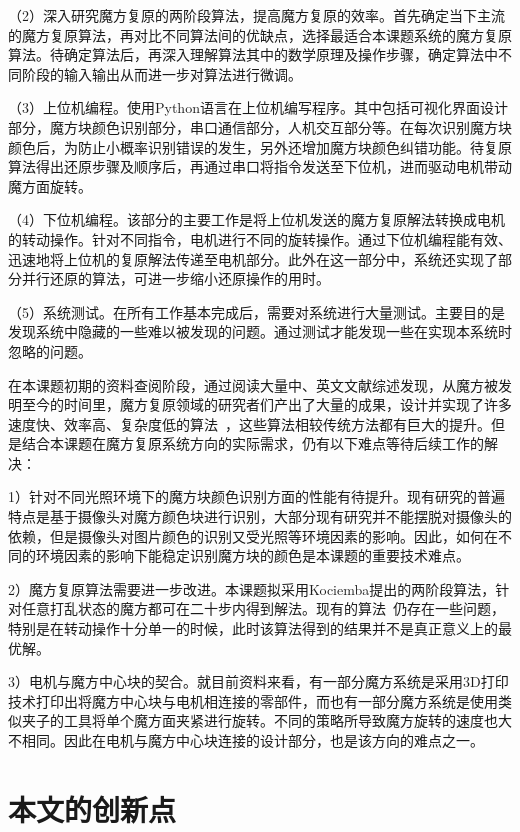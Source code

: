 （2）深入研究魔方复原的两阶段算法，提高魔方复原的效率。首先确定当下主流的魔方复原算法，再对比不同算法间的优缺点，选择最适合本课题系统的魔方复原算法。待确定算法后，再深入理解算法其中的数学原理及操作步骤，确定算法中不同阶段的输入输出从而进一步对算法进行微调。

（3）上位机编程。使用Python语言在上位机编写程序。其中包括可视化界面设计部分，魔方块颜色识别部分，串口通信部分，人机交互部分等。在每次识别魔方块颜色后，为防止小概率识别错误的发生，另外还增加魔方块颜色纠错功能。待复原算法得出还原步骤及顺序后，再通过串口将指令发送至下位机，进而驱动电机带动魔方面旋转。

（4）下位机编程。该部分的主要工作是将上位机发送的魔方复原解法转换成电机的转动操作。针对不同指令，电机进行不同的旋转操作。通过下位机编程能有效、迅速地将上位机的复原解法传递至电机部分。此外在这一部分中，系统还实现了部分并行还原的算法，可进一步缩小还原操作的用时。

（5）系统测试。在所有工作基本完成后，需要对系统进行大量测试。主要目的是发现系统中隐藏的一些难以被发现的问题。通过测试才能发现一些在实现本系统时忽略的问题。

在本课题初期的资料查阅阶段，通过阅读大量中、英文文献综述发现，从魔方被发明至今的时间里，魔方复原领域的研究者们产出了大量的成果，设计并实现了许多速度快、效率高、复杂度低的算法~\cite{22}，这些算法相较传统方法都有巨大的提升。但是结合本课题在魔方复原系统方向的实际需求，仍有以下难点等待后续工作的解决：

1）针对不同光照环境下的魔方块颜色识别方面的性能有待提升。现有研究的普遍特点是基于摄像头对魔方颜色块进行识别，大部分现有研究并不能摆脱对摄像头的依赖，但是摄像头对图片颜色的识别又受光照等环境因素的影响。因此，如何在不同的环境因素的影响下能稳定识别魔方块的颜色是本课题的重要技术难点。

2）魔方复原算法需要进一步改进。本课题拟采用Kociemba提出的两阶段算法，针对任意打乱状态的魔方都可在二十步内得到解法。现有的算法~\cite{23}仍存在一些问题，特别是在转动操作十分单一的时候，此时该算法得到的结果并不是真正意义上的最优解。

3）电机与魔方中心块的契合。就目前资料来看，有一部分魔方系统是采用3D打印技术打印出将魔方中心块与电机相连接的零部件，而也有一部分魔方系统是使用类似夹子的工具将单个魔方面夹紧进行旋转。不同的策略所导致魔方旋转的速度也大不相同。因此在电机与魔方中心块连接的设计部分，也是该方向的难点之一。

\section{本文的创新点}

